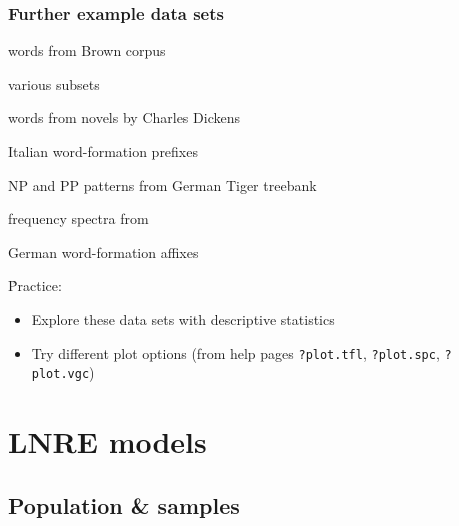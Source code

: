 \documentclass[t]{beamer} %
\begin{document}
\begin{frame}[fragile]
  \frametitle{Further example data sets}

  \begin{description}[labelwidth=5cm]
  \item[\texttt{?Brown}] words from Brown corpus
  \item[\texttt{?BrownSubsets}] various subsets
  \item[\texttt{?Dickens}] words from novels by Charles Dickens
  \item[\texttt{?ItaPref}] Italian word-formation prefixes
  \item[\texttt{?TigerNP}] NP and PP patterns from German Tiger treebank
  \item[\texttt{?Baayen2001}] frequency spectra from \citet{Baayen:01}
  \item[\texttt{?EvertLuedeling2001}] German word-formation affixes \citep[manually corrected data from][]{Evert:Luedeling:01}
  \end{description}

  \h{Practice:}
  \begin{itemize}
  \item Explore these data sets with descriptive statistics
  \item Try different plot options (from help pages \texttt{?plot.tfl}, \texttt{?plot.spc}, \texttt{?plot.vgc})
  \end{itemize}
\end{frame}


\section{LNRE models}

\subsection{Population \& samples}
\end{document}
